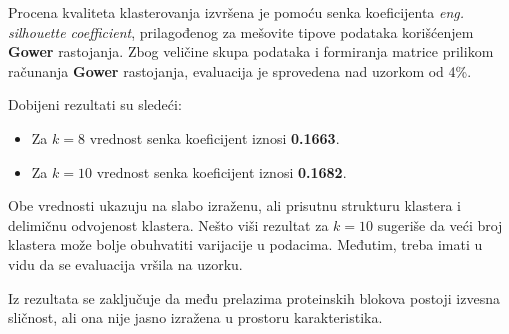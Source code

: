 \documentclass[a4paper,12pt]{article}
\begin{document}
Procena kvaliteta klasterovanja izvršena je pomoću senka koeficijenta \textit{eng. silhouette coefficient}, prilagođenog za mešovite tipove podataka korišćenjem \textbf{Gower} rastojanja. Zbog veličine skupa podataka i formiranja matrice prilikom računanja \textbf{Gower} rastojanja, evaluacija je sprovedena nad uzorkom od 4\%. 

Dobijeni rezultati su sledeći:
\begin{itemize}
    \item Za $k=8$ vrednost senka koeficijent iznosi \textbf{0.1663}.
    \item Za $k=10$ vrednost senka koeficijent iznosi \textbf{0.1682}.
\end{itemize}

Obe vrednosti ukazuju na slabo izraženu, ali prisutnu strukturu klastera i delimičnu odvojenost klastera. Nešto viši rezultat za $k=10$ sugeriše da veći broj klastera može bolje obuhvatiti varijacije u podacima. Međutim, treba imati u vidu da se evaluacija vršila na uzorku.

Iz rezultata se zaključuje da među prelazima proteinskih blokova postoji izvesna sličnost, ali ona nije jasno izražena u prostoru karakteristika.
\newpage
\end{document}

